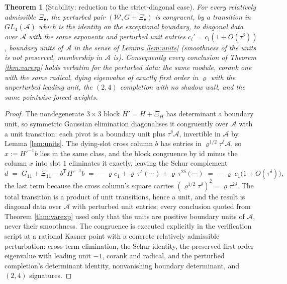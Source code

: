 \documentclass[11pt]{article}
\newtheorem{theorem}{Theorem}[section]
\theoremstyle{definition}
\newcommand{\shW}{\mathcal{W}}
\begin{document}
\begin{theorem}[Stability: reduction to the strict-diagonal case]\label{thm:stability}
For every relatively admissible $\Xi_\bullet$, the perturbed pair $(\shW, G + \Xi_\bullet)$ is congruent, by a transition in $GL_4(\mathcal{A})$ which is the identity on the exceptional boundary, to diagonal data over $\mathcal{A}$ with the \emph{same} exponents and perturbed unit entries $c_i' = c_i(1 + O(\tau^\delta))$, boundary units of $\mathcal{A}$ in the sense of Lemma \ref{lem:units} (smoothness of the units is not preserved, membership in $\mathcal{A}$ is). Consequently every conclusion of Theorem \ref{thm:varexp} holds verbatim for the perturbed data: the same module, corank one with the same radical, dying eigenvalue of exactly first order in $\varrho$ with the unperturbed leading unit, the $(2,4)$ completion with no shadow wall, and the same pointwise-forced weights.
\end{theorem}

\begin{proof}
The nondegenerate $3\times3$ block $H' = H + \Xi_H$ has determinant a boundary unit, so symmetric Gaussian elimination diagonalises it congruently over $\mathcal{A}$ with a unit transition: each pivot is a boundary unit plus $\tau^\delta\mathcal{A}$, invertible in $\mathcal{A}$ by Lemma \ref{lem:units}. The dying-slot cross column $b$ has entries in $\varrho^{1/2}\tau^\delta\mathcal{A}$, so $x := H'^{-1}b$ lies in the same class, and the block congruence by $\mathrm{id}$ minus the column $x$ into slot $1$ eliminates it exactly, leaving the Schur complement
\[
\tilde d \;=\; G_{11} + \Xi_{11} - b^{\mathsf T}H'^{-1}b \;=\; -\varrho c_1 + \varrho\,\tau^\delta(\cdots) + \varrho\,\tau^{2\delta}(\cdots) \;=\; -\varrho\,c_1\bigl(1 + O(\tau^\delta)\bigr),
\]
the last term because the cross column's square carries $(\varrho^{1/2}\tau^\delta)^2 = \varrho\tau^{2\delta}$. The total transition is a product of unit transitions, hence a unit, and the result is diagonal data over $\mathcal{A}$ with perturbed unit entries; every conclusion quoted from Theorem \ref{thm:varexp} used only that the units are positive boundary units of $\mathcal{A}$, never their smoothness. The congruence is executed explicitly in the verification script at a rational Kasner point with a concrete relatively admissible perturbation: cross-term elimination, the Schur identity, the preserved first-order eigenvalue with leading unit $-1$, corank and radical, and the perturbed completion's determinant identity, nonvanishing boundary determinant, and $(2,4)$ signatures.
\end{proof}
\end{document}
